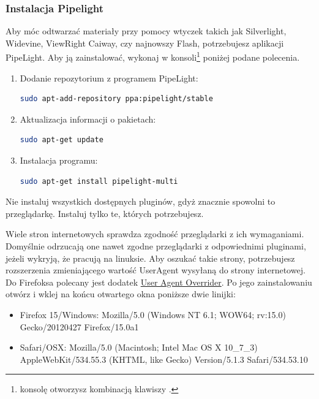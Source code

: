 \subsubsection{Instalacja Pipelight}
Aby móc odtwarzać materiały przy pomocy wtyczek takich jak Silverlight, Widevine, ViewRight Caiway, czy najnowszy Flash, potrzebujesz aplikacji PipeLight. Aby ją zainstalować, wykonaj w konsoli\footnote{konsolę otworzysz kombinacją klawiszy .} poniżej podane polecenia.
\begin{enumerate}
\item Dodanie repozytorium z programem PipeLight:
\begin{lstlisting}[language=bash]
sudo apt-add-repository ppa:pipelight/stable
\end{lstlisting}
\item Aktualizacja informacji o pakietach:
\begin{lstlisting}[language=bash]
sudo apt-get update
\end{lstlisting}
\item Instalacja programu:
\begin{lstlisting}[language=bash]
sudo apt-get install pipelight-multi
\end{lstlisting}
\end{enumerate}

\noindent Nie instaluj wszystkich dostępnych pluginów, gdyż znacznie spowolni to przeglądarkę. Instaluj tylko te, których potrzebujesz.

Wiele stron internetowych sprawdza zgodność przeglądarki z ich wymaganiami. Domyślnie odrzucają one nawet zgodne przeglądarki z odpowiednimi pluginami, jeżeli wykryją, że pracują na linuksie. Aby oszukać takie strony, potrzebujesz rozszerzenia zmieniającego wartość \textcolor{ubuntu_orange}{UserAgent} wysyłaną do strony internetowej. Do Firefoksa polecany jest dodatek \href{https://addons.mozilla.org/pl-PL/firefox/addon/user-agent-overrider/}{User Agent Overrider}. Po jego zainstalowaniu otwórz  i wklej na końcu otwartego okna poniższe dwie linijki:
\begin{itemize}
\item Firefox 15/Windows: Mozilla/5.0 (Windows NT 6.1; WOW64; rv:15.0) Gecko/20120427 Firefox/15.0a1
\item Safari/OSX: Mozilla/5.0 (Macintosh; Intel Mac OS X 10\_7\_3) AppleWebKit/534.55.3 (KHTML, like Gecko) Version/5.1.3 Safari/534.53.10
\end{itemize}

